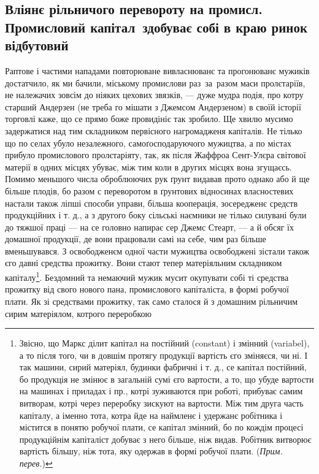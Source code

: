 \subsection{Вліянє рільничого перевороту на промисл.
Промисловий капітал~здобуває собі в краю ринок
відбутовий}

Раптове і частими нападами повторюване вивласнюванє
та прогонюванє мужиків достатчило, як ми бачили,
міському промислови раз~за~разом маси пролєтаріїв, не належачих
зовсім до ніяких цехових звязків, — дуже мудра
подія, про котру старший Андерзен (не треба го мішати
з Джемсом Андерзеном) в своїй історії торговлі каже, що
се прямо боже провидініє так зробило. Ще хвилю мусимо
задержатися над тим складником первісного нагромадженя
капіталів. Не тілько що по селах убуло незалежного, самоґосподаруючого
мужицтва, а по містах прибуло промислового
пролєтаріяту, так, як після Жаффроа Сент-Улєра світової
матерії в одних місцях убуває, між тим коли в других
місцях вона згущаєсь. Помимо меньшого числа оброблюючих
рук ґрунт видавав прото однако або й ще більше
плодів, бо разом с переворотом в ґрунтових відносинах
власностевих настали також ліпші способи управи, більша
кооперація, зосередженє средств продукційних і т. д., а з другого боку
сільські наємники не тілько силувані були до тяжшої
праці — на се головно напирає сер Джемс Стеарт, —
а й обсяг їх домашної продукції, де вони працювали самі
на себе, чим раз більше вменьшувався. З освободженєм
одної части мужицтва освободжені зістали також єго давні
средства прожитку. Вони стают тепер матеріяльним складником
 капіталу\footnote*{
Звісно, що Маркс ділит капітал на постійний (constant) і змінний
(variabel), а то після того, чи в довшім протягу продукції вартість
єго зміняєся, чи ні. І так машини, сирий матеріял, будинки фабричні
і т. д., се капітал постійний, бо продукція не змінює в загальній сумі
єго вартости, а то, що убуде вартости на машинах і приладах і пр.,
котрі зуживаются при роботі, прибуває самим витворам, котрі через переробку
зискуют на вартости. Між тим друга часть капіталу, а іменно
тота, котра йде на наймленє і удержанє робітника і містится в понятю
робучої плати, се капітал змінний, бо по кождім процесі продукційнім
капіталіст добуває з него більше, ніж видав. Робітник витворює вартість
більшу, ніж тота, яку одержав в формі робучої плати. (\emph{Прим. перев.})
}. Бездомний та немаючий мужик
мусит окупувати собі ті средства прожитку від свого
нового пана, промислового капіталіста, в формі робучої
плати. Як зі средствами прожитку, так само сталося й з домашним
рільничим сирим матеріялом, котрого переробкою

